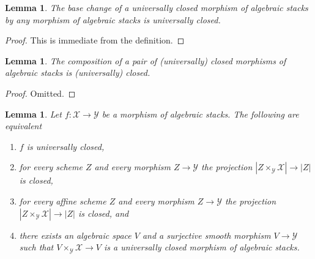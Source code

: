 \documentclass{stacks-project}
\theoremstyle{plain}
\newtheorem{lemma}[subsection]{Lemma}
\theoremstyle{definition}
\theoremstyle{remark}
\numberwithin{equation}{subsection}
\begin{document}
\begin{lemma}
\label{lemma-base-change-universally-closed}
The base change of a universally closed morphism of algebraic stacks
by any morphism of algebraic stacks is universally closed.
\end{lemma}

\begin{proof}
This is immediate from the definition.
\end{proof}

\begin{lemma}
\label{lemma-composition-universally-closed}
The composition of a pair of (universally) closed morphisms of
algebraic stacks is (universally) closed.
\end{lemma}

\begin{proof}
Omitted.
\end{proof}

\begin{lemma}
\label{lemma-universally-closed-local}
Let $f : \mathcal{X} \to \mathcal{Y}$ be a morphism of algebraic stacks.
The following are equivalent
\begin{enumerate}
\item $f$ is universally closed,
\item for every scheme $Z$ and every morphism $Z \to \mathcal{Y}$
the projection $|Z \times_\mathcal{Y} \mathcal{X}| \to |Z|$
is closed,
\item for every affine scheme $Z$ and every morphism $Z \to \mathcal{Y}$
the projection $|Z \times_\mathcal{Y} \mathcal{X}| \to |Z|$ is
closed, and
\item there exists an algebraic space $V$ and a surjective smooth morphism
$V \to \mathcal{Y}$ such that $V \times_\mathcal{Y} \mathcal{X} \to V$
is a universally closed morphism of algebraic stacks.
\end{enumerate}
\end{lemma}
\end{document}
